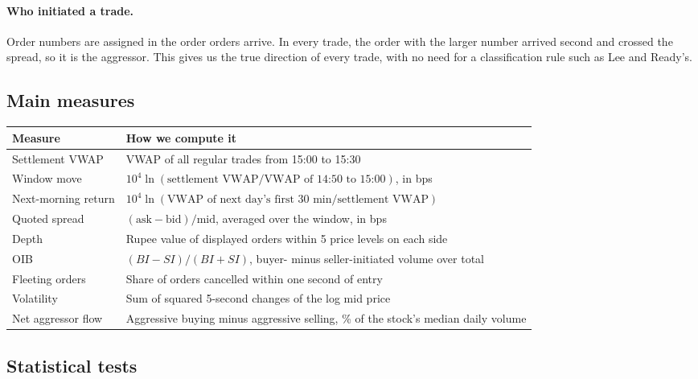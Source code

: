 \documentclass[11pt,a4paper]{article}
\begin{document}
\paragraph{Who initiated a trade.} Order numbers are assigned in the order orders arrive. In every
trade, the order with the larger number arrived second and crossed the spread, so it is the
aggressor. This gives us the true direction of every trade, with no need for a classification
rule such as Lee and Ready's.

\subsection{Main measures}

\begin{center}
\small
\begin{tabularx}{\textwidth}{lX}
\toprule
Measure & How we compute it \\
\midrule
Settlement VWAP & VWAP of all regular trades from 15:00 to 15:30 \\
Window move & $10^4 \ln(\text{settlement VWAP} / \text{VWAP of 14:50 to 15:00})$, in bps \\
Next-morning return & $10^4 \ln(\text{VWAP of next day's first 30 min} / \text{settlement VWAP})$ \\
Quoted spread & $(\text{ask} - \text{bid})/\text{mid}$, averaged over the window, in bps \\
Depth & Rupee value of displayed orders within 5 price levels on each side \\
OIB & $(BI-SI)/(BI+SI)$, buyer- minus seller-initiated volume over total \\
Fleeting orders & Share of orders cancelled within one second of entry \\
Volatility & Sum of squared 5-second changes of the log mid price \\
Net aggressor flow & Aggressive buying minus aggressive selling, \% of the stock's median daily volume \\
\bottomrule
\end{tabularx}
\end{center}

\subsection{Statistical tests}
\end{document}
